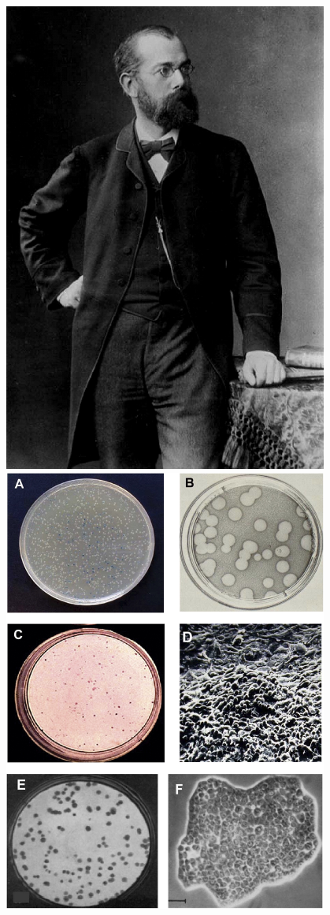 \documentclass[
]{book}
\begin{document}
\includegraphics[width=0.8\textwidth,height=\textheight]{./Figures/koch1.png}
\includegraphics[width=0.8\textwidth,height=\textheight]{./Figures/koch2.png}
\end{document}
